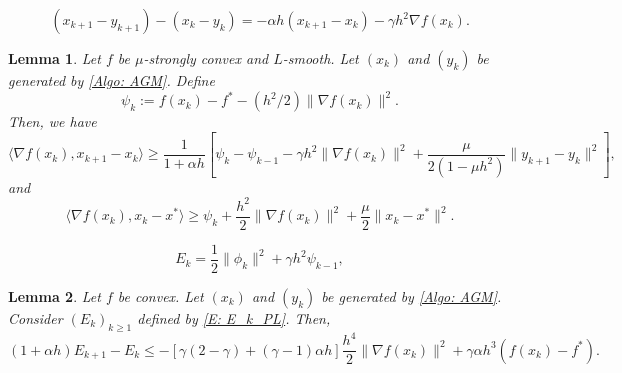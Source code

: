 \documentclass[10pt,a4paper]{amsart}
\newtheorem{lemma}{Lemma}
\begin{document}
\begin{equation}\label{E: iterates}
(x_{k+1}-y_{k+1}) - (x_k-y_k) = -\alpha h(x_{k+1}-x_k) - \gamma h^2 \nabla f(x_k).
\end{equation}

\begin{lemma}\label{Lem: func_bound}
Let $f$ be $\mu$-strongly convex and $L$-smooth. Let $(x_k)$ and $(y_k)$ be generated by \eqref{Algo: AGM}. Define
\begin{equation}\label{E: psi_k}
\psi_k := f(x_k) - f^* - (h^2/2)\| \nabla f(x_k) \|^2.
\end{equation}
Then, we have
$$ \langle \nabla f(x_k), x_{k+1}-x_k \rangle 
\ge \frac{1}{1+\alpha h}\left[ \psi_k - \psi_{k-1} - \gamma h^2 \| \nabla f(x_k) \|^2 + \frac{\mu}{2(1-\mu h^2)}\| y_{k+1} - y_k \|^2 \right], $$
and
$$ \langle \nabla f(x_k), x_k - x^* \rangle 
\ge \psi_k + \frac{h^2}{2} \| \nabla f(x_k) \|^2 + \frac{\mu}{2}\| x_k-x^* \|^2. $$
\end{lemma}

\begin{equation}\label{E: E_k_PL}
E_k = \frac{1}{2}\| \phi_k \|^2 + \gamma h^2 \psi_{k-1},
\end{equation}

\begin{lemma}\label{Lem: E_k_bound_PL}
Let $f$ be convex. Let $(x_k)$ and $(y_k)$ be generated by \eqref{Algo: AGM}. Consider $(E_k)_{k\ge 1}$ defined by \eqref{E: E_k_PL}. Then, 
$$ (1+\alpha h)E_{k+1}-E_k 
\le - \left[ \gamma(2-\gamma) + (\gamma-1) \alpha h \right] \frac{h^4}{2} \| \nabla f(x_k) \|^2
    + \gamma\alpha h^3 \left( f(x_k) - f^* \right). $$
\end{lemma}
\end{document}
